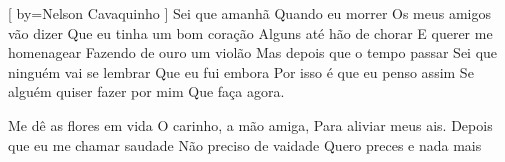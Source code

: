[
    by={Nelson Cavaquinho}
]
\beginverse
Sei que amanhã
Quando eu morrer
Os meus amigos vão dizer
Que eu tinha um bom coração
Alguns até hão de chorar
E querer me homenagear
Fazendo de ouro um violão
Mas depois que o tempo passar
Sei que ninguém vai se lembrar
Que eu fui embora
Por isso é que eu penso assim
Se alguém quiser fazer por mim
Que faça agora.
\endverse

\beginverse
Me dê as flores em vida
O carinho, a mão amiga,
Para aliviar meus ais.
Depois que eu me chamar saudade
Não preciso de vaidade
Quero preces e nada mais
\endverse

\endsong
